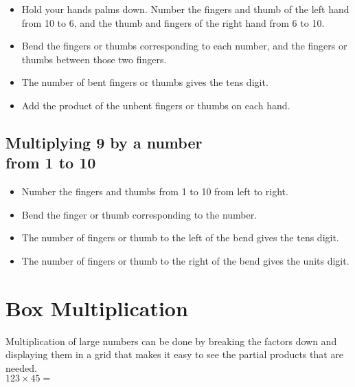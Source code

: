 \documentclass{article}
\begin{document}
\begin{itemize}
\item Hold your hands palms down. Number the fingers and thumb of the left hand from 10 to 6, and the thumb and fingers of the right hand from 6 to 10.
\item Bend the fingers or thumbs corresponding to each number, and the fingers or thumbs between those two fingers.
\item The number of bent fingers or thumbs gives the tens digit.
\item Add the product of the unbent fingers or thumbs on each hand.
\end{itemize}

\pagebreak

\subsection*{Multiplying 9 by a number\\from 1 to 10}

\begin{itemize}
\item Number the fingers and thumbs from 1 to 10 from left to right.
\item Bend the finger or thumb corresponding to the number.
\item The number of fingers or thumb to the left of the bend gives the tens digit.
\item The number of fingers or thumb to the right of the bend gives the units digit.
\end{itemize}

\pagebreak

\section*{Box Multiplication}
Multiplication of large numbers can be done by breaking the factors down and displaying them in a grid that makes it easy to see the partial products that are needed.\\

\noindent
$123\times45 =$\\\\
\noindent
{}
\\
\end{document}
